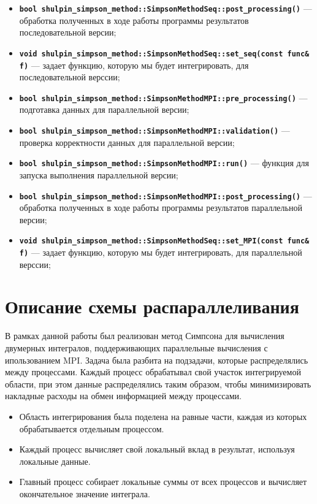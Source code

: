 \documentclass[12pt,a4paper]{article}
\begin{document}
\begin{itemize}
    \item \textbf{\texttt{bool shulpin\_simpson\_method::SimpsonMethodSeq::post\_processing()}} --- обработка полученных в ходе работы программы результатов последовательной версии;
    \item \textbf{\texttt{void shulpin\_simpson\_method::SimpsonMethodSeq::set\_seq(const func\& f)}} --- задает функцию, которую мы будет интегрировать, для последовательной верссии;
    \item \textbf{\texttt{bool shulpin\_simpson\_method::SimpsonMethodMPI::pre\_processing()}} --- подготавка данных для параллельной версии;
    \item \textbf{\texttt{bool shulpin\_simpson\_method::SimpsonMethodMPI::validation()}} --- проверка корректности данных для параллельной версии;
    \item \textbf{\texttt{bool shulpin\_simpson\_method::SimpsonMethodMPI::run()}} --- функция для запуска выполнения параллельной версии;
    \item \textbf{\texttt{bool shulpin\_simpson\_method::SimpsonMethodMPI::post\_processing()}} --- обработка полученных в ходе работы программы результатов параллельной версии;
    \item \textbf{\texttt{void shulpin\_simpson\_method::SimpsonMethodSeq::set\_MPI(const func\& f)}} --- задает функцию, которую мы будет интегрировать, для параллельной верссии;
\end{itemize}

\section*{Описание схемы распараллеливания}

В рамках данной работы был реализован метод Симпсона для вычисления двумерных интегралов, поддерживающих параллельные вычисления с ипользованием MPI. Задача была разбита на подзадачи, которые распределялись между процессами. Каждый процесс обрабатывал свой участок интегрируемой области, при этом данные распределялись таким образом, чтобы минимизировать накладные расходы на обмен информацией между процессами.

\begin{itemize}
    \item Область интегрирования была поделена на равные части, каждая из которых обрабатывается отдельным процессом.
    \item Каждый процесс вычисляет свой локальный вклад в результат, используя локальные данные.
    \item Главный процесс собирает локальные суммы от всех процессов и вычисляет окончательное значение интеграла.
\end{itemize}
\end{document}
